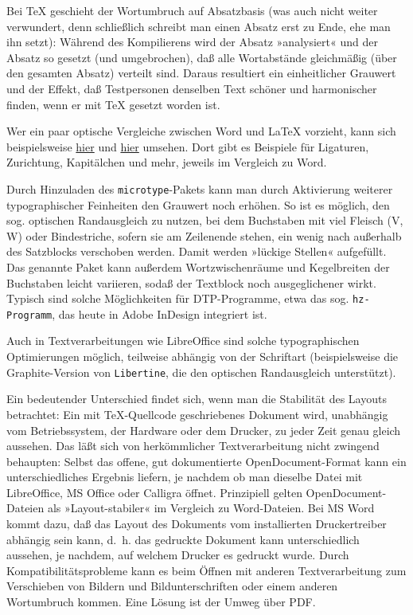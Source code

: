 \documentclass[11pt,a4paper,ngerman,DIV=8]{scrartcl}
\begin{document}
Bei \TeX{} geschieht der Wortumbruch auf Absatzbasis (was auch nicht weiter verwundert, denn schließlich schreibt man einen Absatz erst zu Ende, ehe man ihn setzt): Während des Kompilierens wird der Absatz »analysiert« und der Absatz so gesetzt (und umgebrochen), daß alle Wortabstände gleichmäßig (über den gesamten Absatz) verteilt sind. Daraus resultiert ein einheitlicher Grauwert und der Effekt, daß Testpersonen denselben Text schöner und harmonischer finden, wenn er mit \TeX{} gesetzt worden ist.

Wer ein paar optische Vergleiche zwischen Word und \LaTeX{} vorzieht, kann sich beispielsweise \href{http://nitens.org/taraborelli/latex}{hier} und \href{http://www.niederberger.com.de/warum-latex-ein-vergleich-mit-libreoffice}{hier} umsehen. Dort gibt es Beispiele für Ligaturen, Zurichtung, Kapitälchen und mehr, jeweils im Vergleich zu Word.

Durch Hinzuladen des \texttt{microtype}-Pakets kann man durch Aktivierung weiterer typographischer Feinheiten den Grauwert noch erhöhen. So ist es möglich, den sog. optischen Randausgleich zu nutzen, bei dem Buchstaben mit viel Fleisch (V, W) oder Bindestriche, sofern sie am Zeilenende stehen, ein wenig nach außerhalb des Satzblocks verschoben werden. Damit werden »lückige Stellen« aufgefüllt. Das genannte Paket kann außerdem Wortzwischenräume und Kegelbreiten der Buchstaben leicht variieren, sodaß der Textblock noch ausgeglichener wirkt. Typisch sind solche Möglichkeiten für DTP-Programme, etwa das sog. \texttt{hz-Programm}, das heute in Adobe InDesign integriert ist.

Auch in Textverarbeitungen wie LibreOffice sind solche typographischen Optimierungen möglich, teilweise abhängig von der Schriftart (beispielsweise die Graphite-Version von \texttt{Libertine}, die den optischen Randausgleich unterstützt).

Ein bedeutender Unterschied findet sich, wenn man die Stabilität des Layouts betrachtet: Ein mit \TeX{}-Quellcode geschriebenes Dokument wird, unabhängig vom Betriebssystem, der Hardware oder dem Drucker, zu jeder Zeit genau gleich aussehen. Das läßt sich von herkömmlicher Textverarbeitung nicht zwingend behaupten: Selbst das offene, gut dokumentierte OpenDocument-Format kann ein unterschiedliches Ergebnis liefern, je nachdem ob man dieselbe Datei mit LibreOffice, MS Office oder Calligra öffnet. Prinzipiell gelten OpenDocument-Dateien als »Layout-stabiler« im Vergleich zu Word-Dateien. Bei MS Word kommt dazu, daß das Layout des Dokuments vom installierten Druckertreiber abhängig sein kann, d.~h. das gedruckte Dokument kann unterschiedlich aussehen, je nachdem, auf welchem Drucker es gedruckt wurde. Durch Kompatibilitätsprobleme kann es beim Öffnen mit anderen Textverarbeitung zum Verschieben von Bildern und Bildunterschriften oder einem anderen Wortumbruch kommen. Eine Lösung ist der Umweg über PDF.
\end{document}
